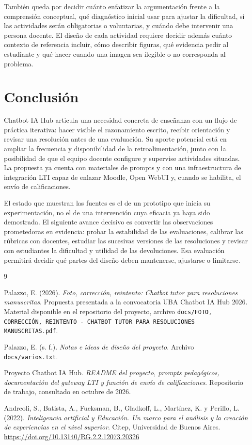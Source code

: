 \documentclass[11pt,a4paper]{article}
\begin{document}
También queda por decidir cuánto enfatizar la argumentación frente a la comprensión conceptual, qué diagnóstico inicial usar para ajustar la dificultad, si las actividades serán obligatorias o voluntarias, y cuándo debe intervenir una persona docente. El diseño de cada actividad requiere decidir además cuánto contexto de referencia incluir, cómo describir figuras, qué evidencia pedir al estudiante y qué hacer cuando una imagen sea ilegible o no corresponda al problema.

\section{Conclusión}

Chatbot IA Hub articula una necesidad concreta de enseñanza con un flujo de práctica iterativa: hacer visible el razonamiento escrito, recibir orientación y revisar una resolución antes de una evaluación. Su aporte potencial está en ampliar la frecuencia y disponibilidad de la retroalimentación, junto con la posibilidad de que el equipo docente configure y supervise actividades situadas. La propuesta ya cuenta con materiales de prompts y con una infraestructura de integración LTI capaz de enlazar Moodle, Open WebUI y, cuando se habilita, el envío de calificaciones.

El estado que muestran las fuentes es el de un prototipo que inicia su experimentación, no el de una intervención cuya eficacia ya haya sido demostrada. El siguiente avance decisivo es convertir las observaciones prometedoras en evidencia: probar la estabilidad de las evaluaciones, calibrar las rúbricas con docentes, estudiar las sucesivas versiones de las resoluciones y revisar con estudiantes la dificultad y utilidad de las devoluciones. Esa evaluación permitirá decidir qué partes del diseño deben mantenerse, ajustarse o limitarse.

\begin{thebibliography}{9}

Palazzo, E. (2026).
\textit{Foto, corrección, reintento: Chatbot tutor para resoluciones manuscritas}.
Propuesta presentada a la convocatoria UBA Chatbot IA Hub 2026. Material disponible en el repositorio del proyecto, archivo \texttt{docs/FOTO, CORRECCIÓN, REINTENTO - CHATBOT TUTOR PARA RESOLUCIONES MANUSCRITAS.pdf}.

Palazzo, E. (s. f.).
\textit{Notas e ideas de diseño del proyecto}.
Archivo \texttt{docs/varios.txt}.

Proyecto Chatbot IA Hub.
\textit{README del proyecto, prompts pedagógicos, documentación del gateway LTI y función de envío de calificaciones}.
Repositorio de trabajo, consultado en octubre de 2026.

Andreoli, S., Batista, A., Fucksman, B., Gladkoff, L., Martínez, K. y Perillo, L. (2022).
\textit{Inteligencia artificial y Educación. Un marco para el análisis y la creación de experiencias en el nivel superior}.
Citep, Universidad de Buenos Aires. \url{https://doi.org/10.13140/RG.2.2.12073.20326}

\end{thebibliography}
\end{document}
